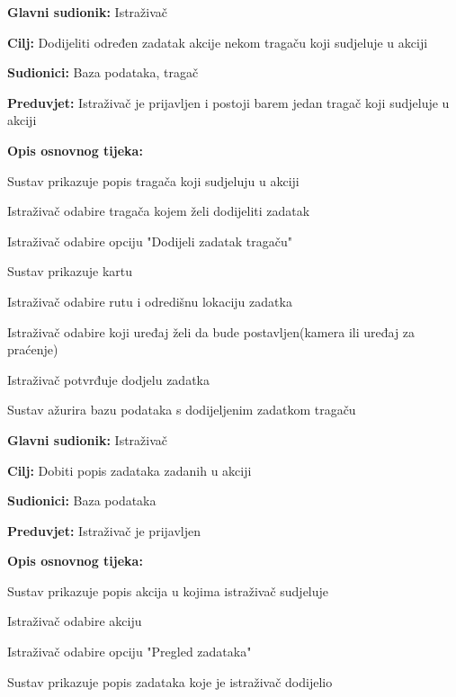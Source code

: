 					\noindent {}
					\begin{packed_item}
						
						\item \textbf{Glavni sudionik:} Istraživač
						\item \textbf{Cilj:} Dodijeliti određen zadatak akcije nekom tragaču koji sudjeluje u akciji
						\item \textbf{Sudionici:} Baza podataka, tragač
						\item \textbf{Preduvjet:} Istraživač je prijavljen i postoji barem jedan tragač koji sudjeluje u akciji
						\item \textbf{Opis osnovnog tijeka:}
						
						\item[] \begin{packed_enum}
							
							\item Sustav prikazuje popis tragača koji sudjeluju u akciji
							\item Istraživač odabire tragača kojem želi dodijeliti zadatak
							\item Istraživač odabire opciju "Dodijeli zadatak tragaču" 
							\item Sustav prikazuje kartu
							\item Istraživač odabire rutu i odredišnu lokaciju zadatka
							\item Istraživač odabire koji uređaj želi da bude postavljen(kamera ili uređaj za praćenje) 
							\item Istraživač potvrđuje dodjelu zadatka 
							\item Sustav ažurira bazu podataka s dodijeljenim zadatkom tragaču 				
						\end{packed_enum}
					\end{packed_item}
					
					\noindent \underbar{\textbf{UC16 - Pregled zadataka}}
					\begin{packed_item}
						
						\item \textbf{Glavni sudionik:} Istraživač
						\item \textbf{Cilj:} Dobiti popis zadataka zadanih u akciji
						\item \textbf{Sudionici:} Baza podataka
						\item \textbf{Preduvjet:} Istraživač je prijavljen
						\item \textbf{Opis osnovnog tijeka:}
						
						\item[] \begin{packed_enum}
							
							\item Sustav prikazuje popis akcija u kojima istraživač sudjeluje
							\item Istraživač odabire akciju
							\item Istraživač odabire opciju "Pregled zadataka"
							\item Sustav prikazuje popis zadataka koje je istraživač dodijelio
						\end{packed_enum}
					\end{packed_item}
					
